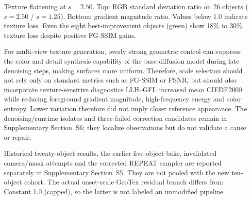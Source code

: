 \documentclass[times,twocolumn,final]{elsarticle}
\providecommand{\DIFadd}[1]{{\protect\color{blue} \sf #1}} %
\providecommand{\DIFdel}[1]{{\protect\color{red} \scriptsize #1}} %
\providecommand{\DIFaddbegin}{} %
\providecommand{\DIFaddend}{} %
\providecommand{\DIFdelbegin}{} %
\providecommand{\DIFdelend}{} %
\providecommand{\DIFdelFL}[1]{\DIFdel{#1}} %
\begin{document}
\DIFdelbegin %
{%
\DIFdelFL{Texture flattening at $s = 2.50$. Top: RGB standard deviation ratio on 26 objects ($s = 2.50$ / $s = 1.25$). Bottom: gradient magnitude ratio. Values below 1.0 indicate texture loss. Even the eight best-improvement objects (green) show 18\% to 30\% texture loss despite positive FG-SSIM gains.}}

\DIFdel{For multi-view texture generation, overly strong geometric control can suppress the color and detail synthesis capability of the base diffusion model during late denoising steps, making surfaces more uniform. Therefore, scale selection should not rely only on standard metrics such as FG-SSIM or PSNR, but should also incorporate texture-sensitive diagnostics}\DIFdelend \DIFaddbegin \DIFadd{LLH--GFL increased mean CIEDE2000 while reducing foreground gradient magnitude, high-frequency energy and color entropy. Lower variation therefore did not imply closer reference appearance. The denoising/runtime isolates and three failed correction candidates remain in Supplementary Section~S6; they localize observations but do not validate a cause or repair}\DIFaddend .

\DIFdelbegin %
\DIFdelend \DIFaddbegin \DIFadd{Historical twenty-object results, the earlier five-object bake, invalidated camera/mask attempts and the corrected REPEAT sampler are reported separately in Supplementary Section~S5. They are not pooled with the new ten-object cohort. The actual unset-scale GeoTex residual branch differs from Constant 1.0 (capped), so the latter is not labeled an unmodified pipeline.
}\DIFaddend 
\end{document}

